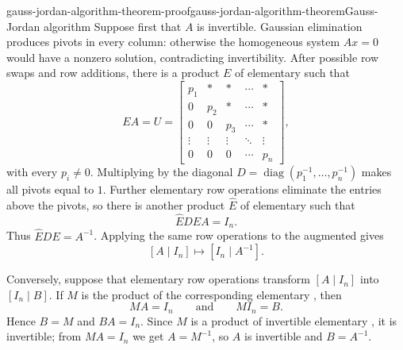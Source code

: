 \documentclass[preview]{standalone}
\begin{document}
\begin{snippetproof}{gauss-jordan-algorithm-theorem-proof}{gauss-jordan-algorithm-theorem}{Gauss-Jordan algorithm}
    Suppose first that \(A\) is invertible. Gaussian elimination produces
    pivots in every column: otherwise the homogeneous system \(Ax=0\) would
    have a nonzero solution, contradicting invertibility. After possible row
    swaps and row additions, there is a product \(E\) of elementary \matrix[matrices]
    such that
    \[
        EA=U=
        \begin{bmatrix}
            p_1 & *   & *   & \cdots & * \\
            0   & p_2 & *   & \cdots & * \\
            0   & 0   & p_3 & \cdots & * \\
            \vdots & \vdots & \vdots & \ddots & \vdots \\
            0   & 0   & 0   & \cdots & p_n
        \end{bmatrix},
    \]
    with every \(p_i\neq0\). Multiplying by the diagonal \matrix
    \(D=\operatorname{diag}(p_1^{-1},\ldots,p_n^{-1})\) makes all pivots
    equal to \(1\). Further elementary row operations eliminate the entries
    above the pivots, so there is another product \(\widehat{E}\) of
    elementary \matrix[matrices] such that
    \[
        \widehat{E}DEA=I_n.
    \]
    Thus \(\widehat{E}DE=A^{-1}\). Applying the same row operations to the
    augmented \matrix gives
    \[
        [A\mid I_n]\longmapsto[I_n\mid A^{-1}].
    \]

    Conversely, suppose that elementary row operations transform
    \([A\mid I_n]\) into \([I_n\mid B]\). If \(M\) is the product of the
    corresponding elementary \matrix[matrices], then
    \[
        MA=I_n
        \qquad\text{and}\qquad
        MI_n=B.
    \]
    Hence \(B=M\) and \(BA=I_n\). Since \(M\) is a product of invertible
    elementary \matrix[matrices], it is invertible; from \(MA=I_n\) we get
    \(A=M^{-1}\), so \(A\) is invertible and \(B=A^{-1}\).
\end{snippetproof}
\end{document}
